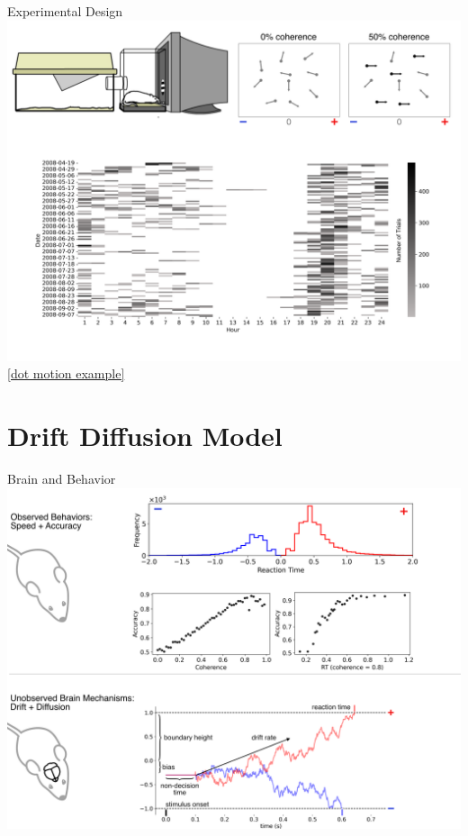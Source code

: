 \documentclass[8pt]{beamer}
\begin{document}
\begin{frame}{Experimental Design}
    \centering
    \includegraphics[width=1\textwidth]{docs/slides/figures/experimental-design.png}
    \small\href{https://www.ratrix.org/images/RatDotMotion.mp4}{[dot motion example]}
\end{frame}

\section{Drift Diffusion Model}

\begin{frame}{Brain and Behavior}
    \includegraphics[width=1\textwidth]{docs/slides/figures/brain-behavior.png}
\end{frame}
\end{document}

